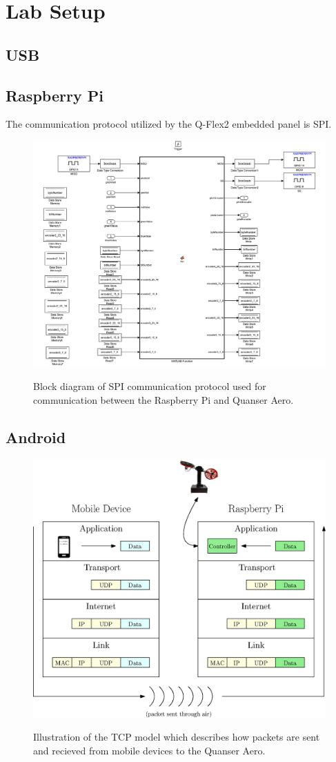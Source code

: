 \chapter{Lab Setup}

\section{USB}


\section{Raspberry Pi}
The communication protocol utilized by the Q-Flex2 embedded panel is SPI.  
\begin{figure}[!htbp]
    \centering
    \includegraphics[width=.46\textwidth,keepaspectratio=true]{figs/img/SPI_COM.pdf}
    \label{fig:SPI_COM}
    \caption{Block diagram of SPI communication protocol used for communication between the Raspberry Pi and Quanser Aero.}
\end{figure}


\section{Android}
\begin{figure}[!htbp]
    \centering
    \includegraphics[width=.46\textwidth,keepaspectratio=true]{figs/ipe/TCPModel.eps}
    \label{fig:TCPModel}
    \caption{Illustration of the TCP model which describes how packets are sent and recieved from mobile devices to the Quanser Aero.}
\end{figure}

